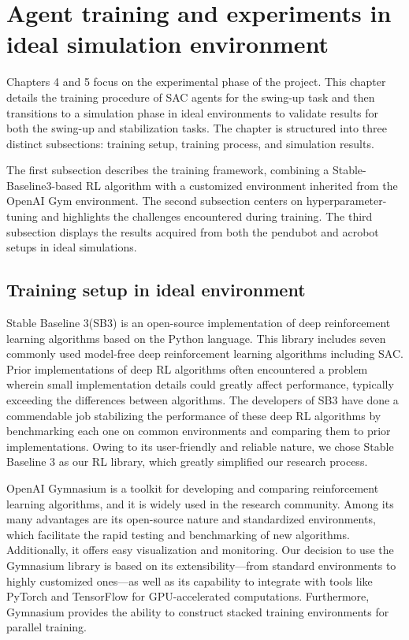 \chapter{Agent training and experiments in ideal simulation environment}
Chapters 4 and 5 focus on the experimental phase of the project. This chapter details the training procedure of SAC agents for the swing-up task and then transitions to a simulation phase in ideal environments to validate results for both the swing-up and stabilization tasks. The chapter is structured into three distinct subsections: training setup, training process, and simulation results.

The first subsection describes the training framework, combining a Stable-Baseline3-based RL algorithm with a customized environment inherited from the OpenAI Gym environment. The second subsection centers on hyperparameter-tuning and highlights the challenges encountered during training. The third subsection displays the results acquired from both the pendubot and acrobot setups in ideal simulations.

\section{Training setup in ideal environment}
Stable Baseline 3(SB3)\cite{stable-baselines3} is an open-source implementation of deep reinforcement learning algorithms based on the Python language. This library includes seven commonly used model-free deep reinforcement learning algorithms including SAC. Prior implementations of deep RL algorithms often encountered a problem wherein small implementation details could greatly affect performance, typically exceeding the differences between algorithms\cite{islam2017reproducibility}. The developers of SB3 have done a commendable job stabilizing the performance of these deep RL algorithms by benchmarking each one on common environments and comparing them to prior implementations. Owing to its user-friendly and reliable nature, we chose Stable Baseline 3 as our RL library, which greatly simplified our research process.

OpenAI Gymnasium\cite{towers_gymnasium_2023} is a toolkit for developing and comparing reinforcement learning algorithms, and it is widely used in the research community. Among its many advantages are its open-source nature and standardized environments, which facilitate the rapid testing and benchmarking of new algorithms. Additionally, it offers easy visualization and monitoring. Our decision to use the Gymnasium library is based on its extensibility—from standard environments to highly customized ones—as well as its capability to integrate with tools like PyTorch and TensorFlow for GPU-accelerated computations. Furthermore, Gymnasium provides the ability to construct stacked training environments for parallel training.


